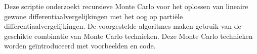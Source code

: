 Deze scriptie onderzoekt  recursieve Monte Carlo voor
het oplossen van lineaire gewone differentiaalvergelijkingen met het
oog op partiële differentiaalvergelijkingen.
De voorgestelde algoritmes maken gebruik van de geschikte
combinatie van Monte Carlo technieken. Deze Monte Carlo technieken
worden geïntroduceerd met voorbeelden en code.